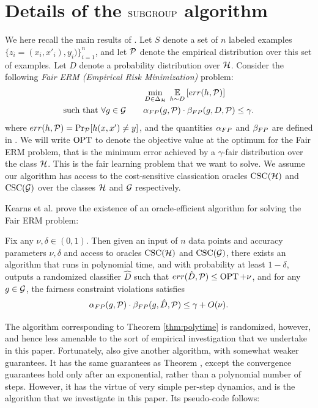 \section{Details of the $\mathrm{SUBGROUP}$ algorithm}
We here recall the main results of \cite{KNRW18}.  Let $S$ denote a
set of $n$ labeled examples $\{z_i = (x_i, x'_i), y_i)\}_{i=1}^n$, and
let $\mathcal{P}$ denote the empirical distribution over this set of examples.
Let $D$ denote a probability distribution over $\mathcal{H}$. Consider the
following {\em Fair ERM (Empirical Risk Minimization)} problem:
\begin{align}
  &  \min_{D\in \Delta_{\mathcal{H}}}\; \operatorname*{\mathbb{E}}_{h\sim D}\left[err(h, \mathcal{P})\right]\\
  \mbox{such that } \forall g\in \mathcal{G} \qquad &
\alpha_{FP}(g, \mathcal{P}) \cdot \beta_{FP}(g, D, \mathcal{P}) \leq \gamma.
\end{align}
where $err(h, \mathcal{P}) = \Pr_{\mathcal{P}}[h(x, x') \neq y]$, and the quantities
$\alpha_{FP}$ and $\beta_{FP}$ are defined in .
We will write $\operatorname{OPT}$ to denote the objective value at the optimum for
the Fair ERM problem, that is the minimum error achieved by a
$\gamma$-fair distribution over the class $\mathcal{H}$. This is the fair learning problem that we want to solve.   We assume our algorithm has access to the cost-sensitive
  classication oracles $\mathrm{CSC}(\mathcal{H})$ and $\mathrm{CSC}(\mathcal{G})$ over the classes
  $\mathcal{H}$ and $\mathcal{G}$ respectively.

Kearns et al. \cite{KNRW18} prove the existence of an oracle-efficient algorithm for solving the Fair ERM problem:

\begin{theorem}\label{thm:polytime}
  Fix any $\nu, \delta\in (0, 1)$. Then given an input of $n$ data
  points and accuracy parameters $\nu, \delta$ and access to oracles
  $\mathrm{CSC}(\mathcal{H})$ and $\mathrm{CSC}(\mathcal{G})$, there exists an algorithm that runs in
  polynomial time, and with probability at least $1 - \delta$, outputs
  a randomized classifier $\hat D$ such that
  $err(\hat D, \mathcal{P}) \leq \operatorname{OPT} + \nu$, and for any $g\in \mathcal{G}$, the
  fairness constraint violations satisfies
  \[
    \alpha_{FP}(g, \mathcal{P}) \cdot\beta_{FP}(g, \hat D, \mathcal{P}) \leq \gamma + O(\nu).
  \]
\end{theorem}


The algorithm corresponding to Theorem \ref{thm:polytime} is randomized, however, and hence less amenable to the sort of empirical investigation that we undertake in this paper. Fortunately, \cite{KNRW18} also give another algorithm, with somewhat weaker guarantees. It has the same guarantees as Theorem \label{thm:polytime}, except the convergence guarantees hold only after an exponential, rather than a polynomial number of steps. However, it has the virtue of very simple per-step dynamics, and is the algorithm that we investigate in this paper. Its pseudo-code follows:

